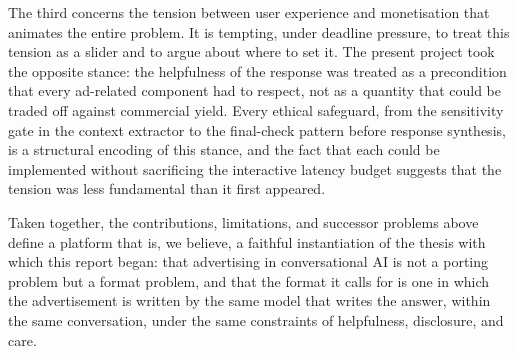 The third concerns the tension between user experience and
monetisation that animates the entire problem. It is tempting, under
deadline pressure, to treat this tension as a slider and to argue
about where to set it. The present project took the opposite stance:
the helpfulness of the response was treated as a precondition that
every ad-related component had to respect, not as a quantity that
could be traded off against commercial yield. Every ethical
safeguard, from the sensitivity gate in the context extractor to the
final-check pattern before response synthesis, is a structural
encoding of this stance, and the fact that each could be implemented
without sacrificing the interactive latency budget suggests that the
tension was less fundamental than it first appeared.

Taken together, the contributions, limitations, and successor
problems above define a platform that is, we believe, a faithful
instantiation of the thesis with which this report began: that
advertising in conversational AI is not a porting problem but a
format problem, and that the format it calls for is one in which the
advertisement is written by the same model that writes the answer,
within the same conversation, under the same constraints of
helpfulness, disclosure, and care.